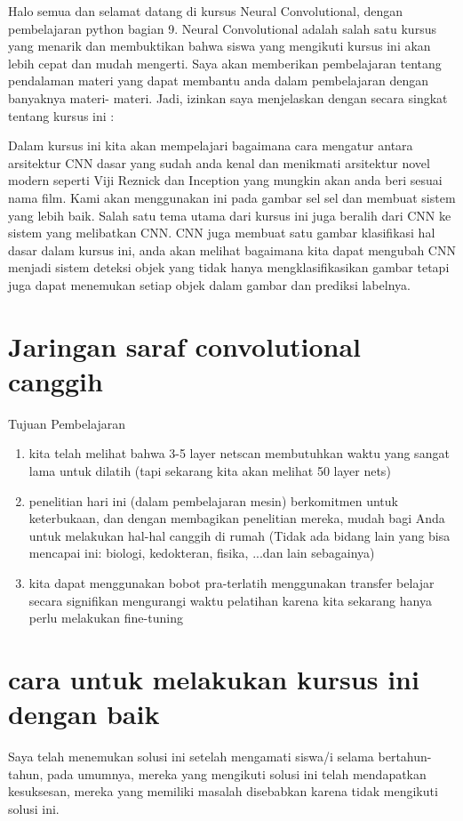  Halo semua dan selamat datang di kursus Neural Convolutional, dengan pembelajaran python bagian 9. Neural Convolutional adalah salah satu kursus yang menarik dan membuktikan bahwa siswa yang mengikuti kursus ini akan lebih cepat dan mudah mengerti. Saya akan memberikan pembelajaran tentang pendalaman materi yang dapat membantu anda dalam pembelajaran  dengan banyaknya materi- materi.
Jadi, izinkan saya menjelaskan dengan secara  singkat tentang kursus ini	:

 Dalam kursus ini kita akan mempelajari bagaimana cara mengatur antara arsitektur CNN dasar yang sudah anda kenal dan menikmati arsitektur novel modern seperti Viji Reznick dan Inception yang mungkin akan anda beri sesuai nama film. Kami akan menggunakan ini pada gambar sel sel dan membuat sistem yang lebih baik.
 Salah satu tema utama dari kursus ini juga beralih dari CNN ke sistem yang melibatkan CNN. CNN juga membuat satu gambar klasifikasi hal dasar dalam kursus ini, anda akan melihat bagaimana kita dapat mengubah CNN menjadi sistem deteksi objek yang tidak hanya mengklasifikasikan gambar tetapi juga dapat menemukan setiap objek dalam gambar dan prediksi labelnya.



\section{Jaringan saraf convolutional canggih}
Tujuan Pembelajaran
\begin{enumerate}

\item  kita telah melihat bahwa 3-5 layer netscan membutuhkan waktu yang sangat lama untuk dilatih
(tapi sekarang kita akan melihat 50 layer nets)
\item penelitian hari ini (dalam pembelajaran mesin) berkomitmen untuk keterbukaan, dan dengan membagikan penelitian mereka, mudah bagi Anda untuk melakukan hal-hal canggih di rumah
(Tidak ada bidang lain yang bisa mencapai ini: biologi, kedokteran, fisika, ...dan lain sebagainya)
\item kita dapat menggunakan bobot pra-terlatih menggunakan transfer belajar secara signifikan mengurangi waktu pelatihan karena kita sekarang hanya perlu melakukan fine-tuning
\end{enumerate}

\section{cara untuk melakukan kursus ini dengan baik}
Saya telah menemukan solusi ini setelah mengamati siswa/i selama bertahun-tahun,
pada umumnya, mereka yang mengikuti solusi ini telah mendapatkan kesuksesan, mereka yang memiliki masalah disebabkan karena tidak mengikuti solusi ini.

